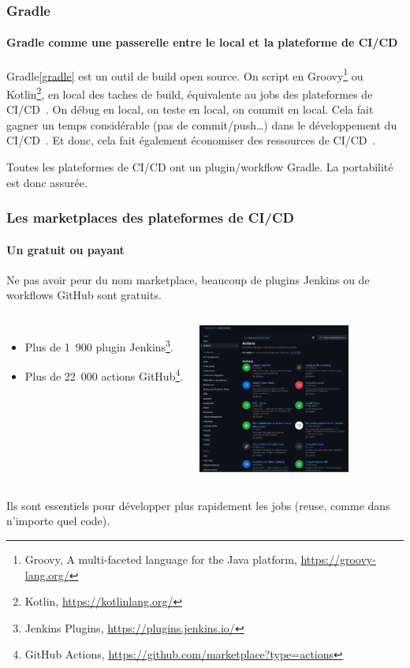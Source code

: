 \documentclass{beamer}
\begin{document}
    \begin{frame}
        \frametitle{Gradle}
        \framesubtitle{Gradle comme une passerelle entre le local et la plateforme de CI/CD}
        \transdissolve
        Gradle\cref{gradle} est un outil de build open source.
        On script en Groovy\footnote{\label{groovy}Groovy, A multi-faceted language for the Java platform, \url{https://groovy-lang.org/}} ou Kotlin\footnote{Kotlin, \url{https://kotlinlang.org/}}, en local des taches de build, équivalente au jobs des plateformes de CI/CD~.
        \bigbreak
        On débug en local, on teste en local, on commit en local.
        Cela fait gagner un temps considérable (pas de commit/push\ldots) dans le développement du CI/CD~.
        Et donc, cela fait également économiser des ressources de CI/CD~.
        \begin{dangercolorbox}
            Toutes les plateformes de CI/CD ont un plugin/workflow Gradle.
            La portabilité est donc assurée.
        \end{dangercolorbox}
    \end{frame}

    \begin{frame}
        \frametitle{Les marketplaces des plateformes de CI/CD}
        \framesubtitle{Un  gratuit ou payant}
        \transdissolve
        Ne pas avoir peur du nom marketplace, beaucoup de plugins Jenkins ou de workflows GitHub sont gratuits.
        \begin{columns}
            \begin{itemize}
                \item Plus de 1~900 plugin Jenkins\footnote[frame]{Jenkins Plugins, \url{https://plugins.jenkins.io/}}.
                \item Plus de 22~000 actions GitHub\footnote[frame]{GitHub Actions, \url{https://github.com/marketplace?type=actions}}.
            \end{itemize}
            \centering
            \includegraphics[width=5cm]{image/github-marketplace}
        \end{columns}
        Ils sont essentiels pour développer plus rapidement les jobs (reuse, comme dans n'importe quel code).
    \end{frame}
\end{document}
